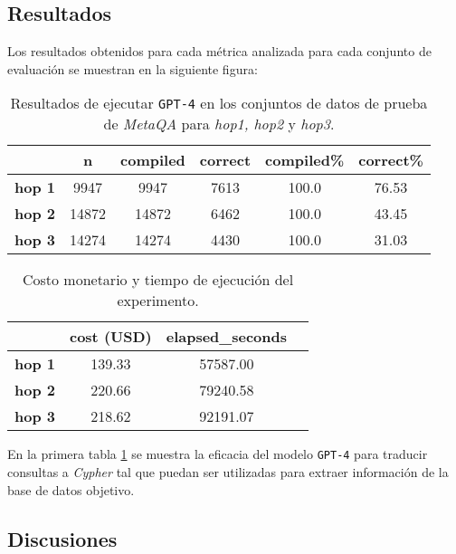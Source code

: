 \subsection{Resultados}

Los resultados obtenidos para cada métrica analizada para cada conjunto de evaluación se muestran en la siguiente figura:

\begin{table}[H]
\centering
\begin{tabular}{|c|c|c|c|c|c|}
\hline
 & \textbf{n} & \textbf{compiled} & \textbf{correct} & \textbf{compiled\%} & \textbf{correct\%} \\ \hline
\textbf{hop 1} & 9947 & 9947 & 7613 & 100.0 & 76.53  \\ \hline
\textbf{hop 2} & 14872 & 14872 & 6462 & 100.0 & 43.45  \\ \hline
\textbf{hop 3} & 14274 & 14274 & 4430 & 100.0 & 31.03  \\ \hline
\end{tabular}
\caption{Resultados de ejecutar \texttt{GPT-4} en los conjuntos de datos de prueba de \textit{MetaQA} para \textit{hop1, hop2} y \textit{hop3}.}
\label{tab:results1}
\end{table}

\begin{table}[H]
\centering
\begin{tabular}{|c|c|c|c|}
\hline
 & \textbf{cost (USD)} & \textbf{elapsed\_seconds} \\ \hline
\textbf{hop 1} & 139.33 & 57587.00 \\ \hline
\textbf{hop 2} & 220.66 & 79240.58 \\ \hline
\textbf{hop 3} & 218.62 & 92191.07 \\ \hline
\end{tabular}
\caption{Costo monetario y tiempo de ejecución del experimento.}
\label{tab:result2}
\end{table}

En la primera tabla \ref{tab:results1} se muestra la eficacia del modelo \texttt{GPT-4} para traducir consultas a \textit{Cypher} tal que puedan ser utilizadas para extraer información de la base de datos objetivo.


\subsection{Discusiones}


